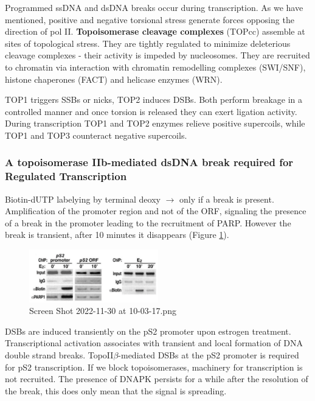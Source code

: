 Programmed ssDNA and dsDNA breaks occur during transcription. As we have mentioned, positive and negative torsional stress generate forces opposing the direction of pol II. \textbf{Topoisomerase cleavage complexes} (TOPcc) assemble at sites of topological stress. They are tightly regulated to minimize deleterious cleavage complexes - their activity is impeded by nucleosomes. They are recruited to chromatin via interaction with chromatin remodelling complexes (SWI/SNF), histone chaperones (FACT) and helicase enzymes (WRN).

TOP1 triggers SSBs or nicks, TOP2 induces DSBs. Both perform breakage in a controlled manner and once torsion is released they can exert ligation activity. During transcription TOP1 and TOP2 enzymes relieve positive supercoils, while TOP1 and TOP3 counteract negative supercoils.

\hypertarget{a-topoisomerase-iib-mediated-dsdna-break-required-for-regulated-transcription}{%
\subsubsection{A topoisomerase IIb-mediated dsDNA break required for Regulated Transcription}\label{a-topoisomerase-iib-mediated-dsdna-break-required-for-regulated-transcription}}

Biotin-dUTP labelying by terminal deoxy $\rightarrow$ only if a break is present. Amplification of the promoter region and not of the ORF, signaling the presence of a break in the promoter leading to the recruitment of PARP. However the break is transient, after 10 minutes it disappears (Figure \ref{fig:biot}).

\begin{figure}
\centering
\includegraphics[width=0.5\textwidth]{../_resources/Screen_Shot_2022-11-30_at_10-03-17.png}
\caption{Screen Shot 2022-11-30 at 10-03-17.png}
\label{fig:biot}
\end{figure}

DSBs are induced transiently on the pS2 promoter upon estrogen treatment. Transcriptional activation associates with transient and local formation of DNA double strand breaks. TopoII$\beta$-mediated DSBs at the pS2 promoter is required for pS2 transcription. If we block topoisomerases, machinery for transcription is not recruited. The presence of DNAPK persists for a while after the resolution of the break, this does only mean that the signal is spreading.

